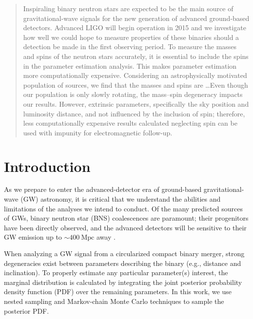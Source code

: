 \begin{abstract}
Inspiraling binary neutron stars are expected to be the main source of gravitational-wave signals for the new generation of advanced ground-based detectors. Advanced LIGO will begin operation in 2015 and we investigate how well we could hope to measure properties of these binaries should a detection be made in the first observing period. To measure the masses and spins of the neutron stars accurately, it is essential to include the spins in the parameter estimation analysis. This makes parameter estimation more computationally expensive. Considering an astrophysically motivated population of sources, we find that the masses and spins are \ldots Even though our population is only slowly rotating, the mass--spin degeneracy impacts our results. However, extrinsic parameters, specifically the sky position and luminosity distance, and not influenced by the inclusion of spin; therefore, less computationally expensive results calculated neglecting spin can be used with impunity for electromagnetic follow-up.
\end{abstract}


\section{Introduction}

As we prepare to enter the advanced-detector era of ground-based gravitational-wave (GW) astronomy, it is critical that we understand the abilities and limitations of the analyses we intend to conduct. Of the many predicted sources of GWs, binary neutron star (BNS) coalescences are paramount; their progenitors have been directly observed, and the advanced detectors will be sensitive to their GW emission up to $\sim 400~\mathrm{Mpc}$ away \citep{2013arXiv1304.0670L}.

When analyzing a GW signal from a circularized compact binary merger, strong degeneracies exist between parameters describing the binary (e.g., distance and inclination). To properly estimate any particular parameter(s) interest, the marginal distribution is calculated by integrating the joint posterior probability density function (PDF) over the remaining parameters. In this work, we use nested sampling \citep{Veitch_2010} and Markov-chain Monte Carlo \citep{Christensen_2003,R_ver_2006,van_der_Sluys_2008} techniques to sample the posterior PDF.

